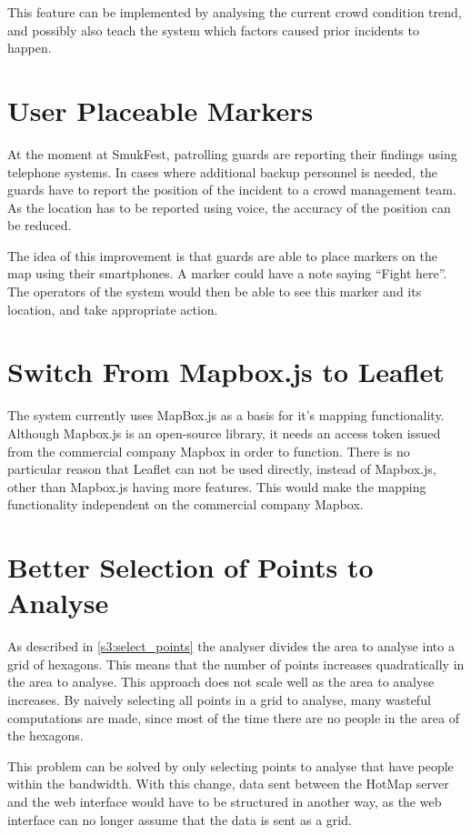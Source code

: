 This feature can be implemented by analysing the current crowd condition trend, and possibly also teach the system which factors caused prior incidents to happen.

\section{User Placeable Markers}
At the moment at SmukFest, patrolling guards are reporting their findings using telephone systems. In cases where additional backup personnel is needed, the guards have to report the position of the incident to a crowd management team. As the location has to be reported using voice, the accuracy of the position can be reduced.

The idea of this improvement is that guards are able to place markers on the map using their smartphones. A marker could have a note saying \enquote{Fight here}. The operators of the system would then be able to see this marker and its location, and take appropriate action.

\section{Switch From Mapbox.js to Leaflet}
The system currently uses MapBox.js as a basis for it's mapping functionality. Although Mapbox.js is an open-source library, it needs an access token issued from the commercial company Mapbox in order to function. There is no particular reason that Leaflet can not be used directly, instead of Mapbox.js, other than Mapbox.js having more features. This would make the mapping functionality independent on the commercial company Mapbox.

\section{Better Selection of Points to Analyse}
As described in \cref{s3:select_points} the analyser divides the area to analyse into a grid of hexagons. This means that the number of points increases quadratically in the area to analyse. This approach does not scale well as the area to analyse increases. By naively selecting all points in a grid to analyse, many wasteful computations are made, since most of the time there are no people in the area of the hexagons.

This problem can be solved by only selecting points to analyse that have people within the bandwidth. With this change, data sent between the HotMap server and the web interface would have to be structured in another way, as the web interface can no longer assume that the data is sent as a grid.